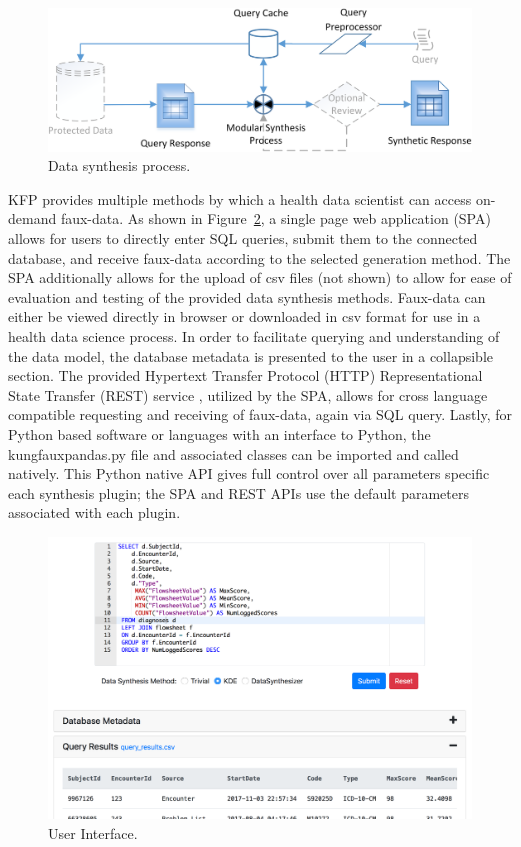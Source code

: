 \documentclass{amia}
\begin{document}
\begin{figure}[ht]
  \centering
  \includegraphics[width=120mm]{data_synthesis_process}
  \caption{Data synthesis process.}
  \label{fig:synthesis_process}
\end{figure}

KFP provides multiple methods by which a health data scientist can access on-demand faux-data. As shown in Figure~\ref{fig:ui}, a single page web application (SPA) allows for users to directly enter SQL queries, submit them to the connected database, and receive faux-data according to the selected generation method. The SPA additionally allows for the upload of csv files (not shown) to allow for ease of evaluation and testing of the provided data synthesis methods. Faux-data can either be viewed directly in browser or downloaded in csv format for use in a health data science process. In order to facilitate querying and understanding of the data model, the database metadata is presented to the user in a collapsible section. The provided Hypertext Transfer Protocol (HTTP) Representational State Transfer (REST) service \cite{w3c_working_group_webservices}, utilized by the SPA, allows for cross language compatible requesting and receiving of faux-data, again via SQL query. Lastly, for Python based software or languages with an interface to Python, the kungfauxpandas.py file and associated classes can be imported and called natively. This Python native API gives full control over all parameters specific each synthesis plugin; the SPA and REST APIs use the default parameters associated with each plugin.

\begin{figure}[ht]
  \centering
  \includegraphics[width=\textwidth]{ui_screenshot3}
  \caption{User Interface.}
  \label{fig:ui}
\end{figure}
\end{document}
